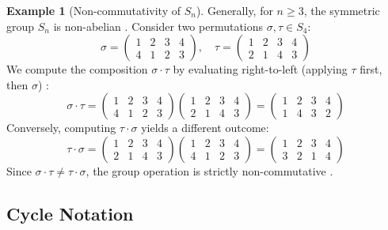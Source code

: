 \documentclass[11pt]{article}
\theoremstyle{definition}
\newtheorem{example}{Example}[section]
\theoremstyle{plain}
\theoremstyle{remark}
\begin{document}
\begin{example}[Non-commutativity of $S_n$]
Generally, for $n \ge 3$, the symmetric group $S_n$ is non-abelian \cite{fraleigh}. Consider two permutations $\sigma, \tau \in S_4$:
\begin{equation}
    \sigma = \begin{pmatrix} 1 & 2 & 3 & 4 \\ 4 & 1 & 2 & 3 \end{pmatrix}, \quad 
    \tau = \begin{pmatrix} 1 & 2 & 3 & 4 \\ 2 & 1 & 4 & 3 \end{pmatrix}
\end{equation}
We compute the composition $\sigma \cdot \tau$ by evaluating right-to-left (applying $\tau$ first, then $\sigma$) \cite{dummit}:
\begin{equation}
    \sigma \cdot \tau = \begin{pmatrix} 1 & 2 & 3 & 4 \\ 4 & 1 & 2 & 3 \end{pmatrix} \begin{pmatrix} 1 & 2 & 3 & 4 \\ 2 & 1 & 4 & 3 \end{pmatrix} = \begin{pmatrix} 1 & 2 & 3 & 4 \\ 1 & 4 & 3 & 2 \end{pmatrix}
\end{equation}
Conversely, computing $\tau \cdot \sigma$ yields a different outcome:
\begin{equation}
    \tau \cdot \sigma = \begin{pmatrix} 1 & 2 & 3 & 4 \\ 2 & 1 & 4 & 3 \end{pmatrix} \begin{pmatrix} 1 & 2 & 3 & 4 \\ 4 & 1 & 2 & 3 \end{pmatrix} = \begin{pmatrix} 1 & 2 & 3 & 4 \\ 3 & 2 & 1 & 4 \end{pmatrix}
\end{equation}
Since $\sigma \cdot \tau \neq \tau \cdot \sigma$, the group operation is strictly non-commutative \cite{gallian}.
\end{example}

\subsection{Cycle Notation}
\end{document}
